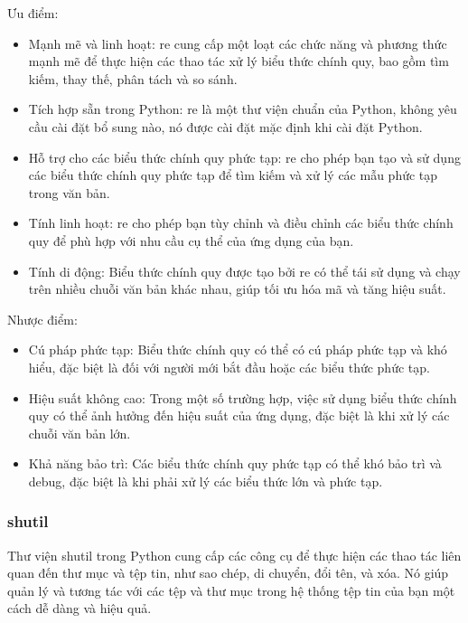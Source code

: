 \documentclass{article} %
\begin{document}
Ưu điểm:
\begin{itemize}
    \item Mạnh mẽ và linh hoạt: re cung cấp một loạt các chức năng và phương thức mạnh mẽ để thực hiện các thao tác xử lý biểu thức chính quy, bao gồm tìm kiếm, thay thế, phân tách và so sánh.
    \item Tích hợp sẵn trong Python: re là một thư viện chuẩn của Python, không yêu cầu cài đặt bổ sung nào, nó được cài đặt mặc định khi cài đặt Python.
    \item Hỗ trợ cho các biểu thức chính quy phức tạp: re cho phép bạn tạo và sử dụng các biểu thức chính quy phức tạp để tìm kiếm và xử lý các mẫu phức tạp trong văn bản.
    \item Tính linh hoạt: re cho phép bạn tùy chỉnh và điều chỉnh các biểu thức chính quy để phù hợp với nhu cầu cụ thể của ứng dụng của bạn.
    \item Tính di động: Biểu thức chính quy được tạo bởi re có thể tái sử dụng và chạy trên nhiều chuỗi văn bản khác nhau, giúp tối ưu hóa mã và tăng hiệu suất.
\end{itemize}
\hspace{0.0em} Nhược điểm:
\begin{itemize}
    \item Cú pháp phức tạp: Biểu thức chính quy có thể có cú pháp phức tạp và khó hiểu, đặc biệt là đối với người mới bắt đầu hoặc các biểu thức phức tạp.
    \item Hiệu suất không cao: Trong một số trường hợp, việc sử dụng biểu thức chính quy có thể ảnh hưởng đến hiệu suất của ứng dụng, đặc biệt là khi xử lý các chuỗi văn bản lớn.
    \item Khả năng bảo trì: Các biểu thức chính quy phức tạp có thể khó bảo trì và debug, đặc biệt là khi phải xử lý các biểu thức lớn và phức tạp.
\end{itemize}
\subsubsection{shutil}
Thư viện shutil trong Python cung cấp các công cụ để thực hiện các thao tác liên quan đến thư mục và tệp tin, như sao chép, di chuyển, đổi tên, và xóa. Nó giúp quản lý và tương tác với các tệp và thư mục trong hệ thống tệp tin của bạn một cách dễ dàng và hiệu quả.
\end{document}

